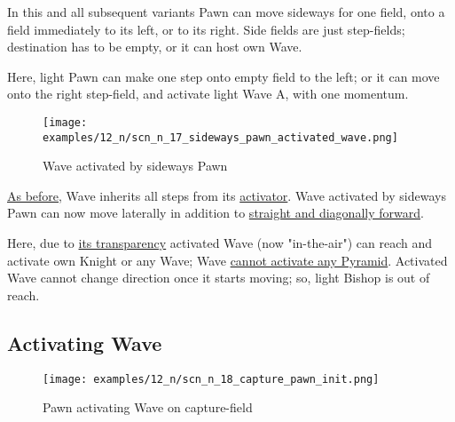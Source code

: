 \vspace*{-0.5\baselineskip}
In this and all subsequent variants Pawn can move sideways for one field, onto a field
immediately to its left, or to its right. Side fields are just step-fields; destination
has to be empty, or it can host own Wave.

Here, light Pawn can make one step onto empty field to the left; or it can move onto
the right step-field, and activate light Wave A, with one momentum.

\clearpage %

\vspace*{-2.1\baselineskip}
\noindent
\begin{figure}[!h]
\texttt{[image: examples/12\_n/scn\_n\_17\_sideways\_pawn\_activated\_wave.png]}
\vspace*{-1.4\baselineskip}
\caption{Wave activated by sideways Pawn}
\label{fig:scn_n_17_sideways_pawn_activated_wave}
\end{figure}

\vspace*{-0.5\baselineskip}
\hyperref[fig:scn_mv_019_bishop_activating_wave]{As before}, Wave inherits all steps
from its \hyperref[sec:Terms/Activator]{activator}. Wave activated by sideways Pawn
can now move laterally in addition to
\hyperref[fig:scn_mv_026_wave_activated_by_step_pawn]{straight and diagonally forward}.

Here, due to \hyperref[fig:scn_mv_011_wave_is_transparent]{its transparency} activated
Wave (now "in-the-air") can reach and activate own Knight or any Wave; Wave
\hyperref[fig:scn_mv_009_not_activating_pyramid_by_wave]{cannot activate any Pyramid}.
Activated Wave cannot change direction once it starts moving; so, light Bishop is out
of reach.

\clearpage %

\subsection*{Activating Wave}
\label{sec:Nineteen/Sideways Pawns/Activating Wave}

\vspace*{-1.4\baselineskip}
\noindent
\begin{figure}[!h]
\texttt{[image: examples/12\_n/scn\_n\_18\_capture\_pawn\_init.png]}
\vspace*{-1.4\baselineskip}
\caption{Pawn activating Wave on capture-field}
\label{fig:scn_n_18_capture_pawn_init}
\end{figure}

